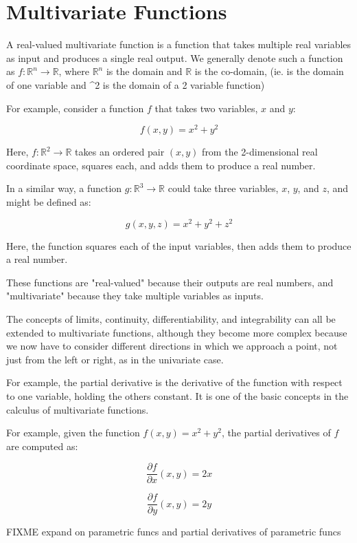 \chapter{Multivariate Functions}

A real-valued multivariate function is a function that takes multiple
real variables as input and produces a single real output.
We generally denote such a function as $f: \mathbb{R}^n \rightarrow
\mathbb{R}$, where $\mathbb{R}^n$ is the domain and $\mathbb{R}$ is
the co-domain, (ie.  is the domain of one variable and ^2 is the domain of a 2 variable function)

For example, consider a function $f$ that takes two variables, $x$ and
$y$:

\begin{equation*}
f(x, y) = x^2 + y^2
\end{equation*}

Here, $f: \mathbb{R}^2 \rightarrow \mathbb{R}$ takes an ordered pair
$(x, y)$ from the 2-dimensional real coordinate space, squares each,
and adds them to produce a real number.

In a similar way, a function $g: \mathbb{R}^3 \rightarrow \mathbb{R}$
could take three variables, $x$, $y$, and $z$, and might be defined as:

\begin{equation*}
g(x, y,z) = x^2 + y^2 + z^2
\end{equation*}

Here, the function squares each of the input variables, then adds
them to produce a real number.

These functions are "real-valued" because their outputs are real
numbers, and "multivariate" because they take multiple variables as
inputs.

The concepts of limits, continuity, differentiability, and
integrability can all be extended to multivariate functions, although
they become more complex because we now have to consider different
directions in which we approach a point, not just from the left or
right, as in the univariate case. 

For example, the partial derivative
is the derivative of the function with respect to one variable,
holding the others constant. It is one of the basic concepts in the
calculus of multivariate functions.

For example, given the function $f(x, y) = x^2 + y^2$, the partial
derivatives of $f$ are computed as:

\begin{equation*}
\frac{\partial f}{\partial x}(x, y) = 2x
\end{equation*}

\begin{equation*}
\frac{\partial f}{\partial y}(x, y) = 2y
\end{equation*}

FIXME expand on parametric funcs and partial derivatives of parametric funcs